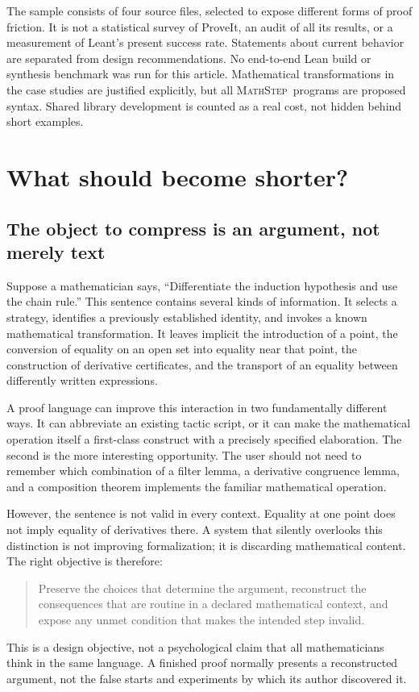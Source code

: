 \documentclass[11pt,a4paper]{article}
\theoremstyle{remark}
\newcommand{\ms}{\textsc{MathStep}}
\begin{document}
The sample consists of four source files, selected to expose different forms of proof friction. It is not a statistical survey of ProveIt, an audit of all its results, or a measurement of Leant's present success rate. Statements about current behavior are separated from design recommendations. No end-to-end Lean build or synthesis benchmark was run for this article. Mathematical transformations in the case studies are justified explicitly, but all \ms\ programs are proposed syntax. Shared library development is counted as a real cost, not hidden behind short examples.

\newpage
\begingroup
\setlength{\parskip}{0pt}
\small
\tableofcontents
\endgroup
\newpage

\section{What should become shorter?}\label{sec:problem}

\subsection{The object to compress is an argument, not merely text}
Suppose a mathematician says, ``Differentiate the induction hypothesis and use the chain rule.'' This sentence contains several kinds of information. It selects a strategy, identifies a previously established identity, and invokes a known mathematical transformation. It leaves implicit the introduction of a point, the conversion of equality on an open set into equality near that point, the construction of derivative certificates, and the transport of an equality between differently written expressions.

A proof language can improve this interaction in two fundamentally different ways. It can abbreviate an existing tactic script, or it can make the mathematical operation itself a first-class construct with a precisely specified elaboration. The second is the more interesting opportunity. The user should not need to remember which combination of a filter lemma, a derivative congruence lemma, and a composition theorem implements the familiar mathematical operation.

However, the sentence is not valid in every context. Equality at one point does not imply equality of derivatives there. A system that silently overlooks this distinction is not improving formalization; it is discarding mathematical content. The right objective is therefore:
\begin{quote}
Preserve the choices that determine the argument, reconstruct the consequences that are routine in a declared mathematical context, and expose any unmet condition that makes the intended step invalid.
\end{quote}
This is a design objective, not a psychological claim that all mathematicians think in the same language. A finished proof normally presents a reconstructed argument, not the false starts and experiments by which its author discovered it.
\end{document}
